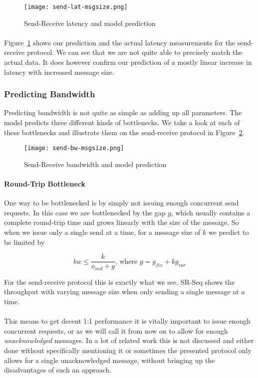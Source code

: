 \begin{figure}[ht]
  \centering
  \texttt{[image: send-lat-msgsize.png]}
  \caption{Send-Receive latency and model prediction}
    \label{fig:model-lat}
\end{figure}

\paragraph{} Figure~\ref{fig:model-lat} shows our prediction and the actual latency measurements for the send-receive protocol.
We can see that we are not quite able to precisely match the actual data. It does
however confirm our prediction of a mostly linear increase in latency with increased message size.

\pagebreak
\subsubsection{Predicting Bandwidth}
Predicting bandwidth is not quite as simple as adding up all parameters. The model predicts three different kinds of
bottlenecks. We take a look at each of these bottlenecks and illustrate them on the send-receive protocol in Figure~\ref{fig:model-bw}.

\begin{figure}[ht]
  \centering
  \texttt{[image: send-bw-msgsize.png]}
  \caption{Send-Receive bandwidth and model prediction}
    \label{fig:model-bw}
\end{figure}

\paragraph{Round-Trip Bottleneck} One way to be bottlenecked is by simply not issuing enough concurrent send requests. In 
this case we are bottlenecked by the gap $g$, which usually contains a complete round-trip time and grows linearly with 
the size of the message. So when we issue only a single send at a time, for a message size of $k$ we predict to be limited by

$$
bw \leq \frac{k}{o_{snd} + g}\text{, where } g = g_{fix} + kg_{var} 
$$

For the send-receive protocol this is exactly what we see. SR-Seq shows the throughput with varying message size when only 
sending a single message at a time. 

\paragraph{} This means to get decent 1:1 performance it is vitally important to issue enough concurrent requests, or as we 
will call it from now on to allow for enough \emph{unacknowledged} messages. In a lot of related work this is not discussed
and either done without specifically mentioning it or sometimes the presented protocol only allows for a single unacknowledged
message, without bringing up the disadvantages of such an approach.


